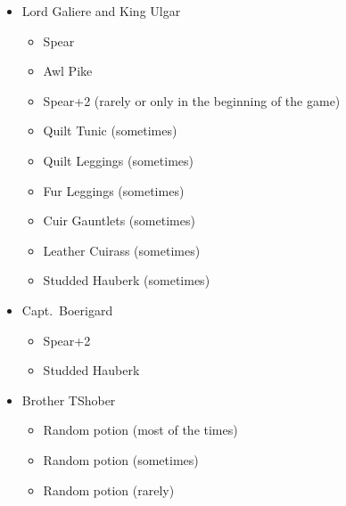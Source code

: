 \documentclass[12pt]{article}
\providecommand{\tightlist}{%
  \setlength{\itemsep}{0pt}\setlength{\parskip}{0pt}}
\begin{document}
\begin{multicols}{2}
\begin{itemize}\RaggedRight{}
\item Lord Galiere and King Ulgar
  \begin{itemize}
    \tightlist
    \item Spear
    \item Awl Pike
    \item Spear+2 (rarely or only in the beginning of the game)
    \item Quilt Tunic (sometimes)
    \item Quilt Leggings (sometimes)
    \item Fur Leggings (sometimes)
    \item Cuir Gauntlets (sometimes)
    \item Leather Cuirass (sometimes)
    \item Studded Hauberk (sometimes)
  \end{itemize}

\item Capt.~Boerigard
  \begin{itemize}
    \tightlist
    \item Spear+2
    \item Studded Hauberk
  \end{itemize}

\item Brother TShober
  \begin{itemize}
    \tightlist
    \item Random potion (most of the times)
    \item Random potion (sometimes)
    \item Random potion (rarely)
  \end{itemize}


\end{itemize}
\end{multicols}
\end{document}
